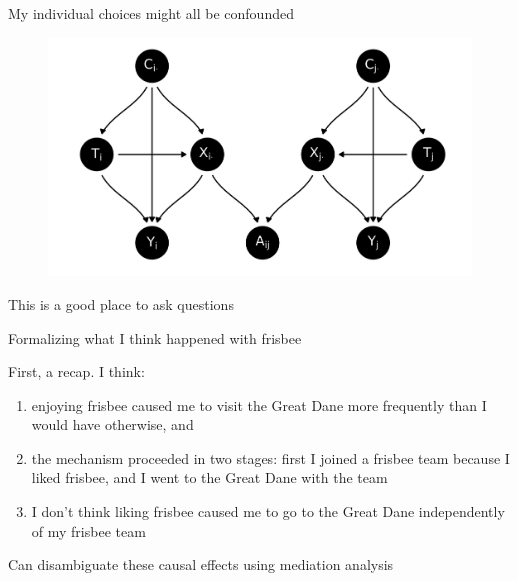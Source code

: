 \documentclass{beamer}
\theoremstyle{remark}
\begin{document}
\begin{frame}{My individual choices might all be confounded}

    \centering

    \begin{figure}
        \includegraphics[scale=0.65]{figures/dags/mediating-5.png}
        \label{fig:mediating-5}
    \end{figure}

    This is a good place to ask questions

\end{frame}

\begin{frame}{Formalizing what I think happened with frisbee}

    First, a recap. I think:

    \begin{enumerate}
        \item enjoying frisbee caused me to visit the Great Dane more frequently than I would have otherwise, and

        \item the mechanism proceeded in two stages: first I joined a frisbee team because I liked frisbee, and I went to the Great Dane with the team

        \item I don't think liking frisbee caused me to go to the Great Dane independently of my frisbee team
    \end{enumerate}

    Can disambiguate these causal effects using mediation analysis
\end{frame}
\end{document}
